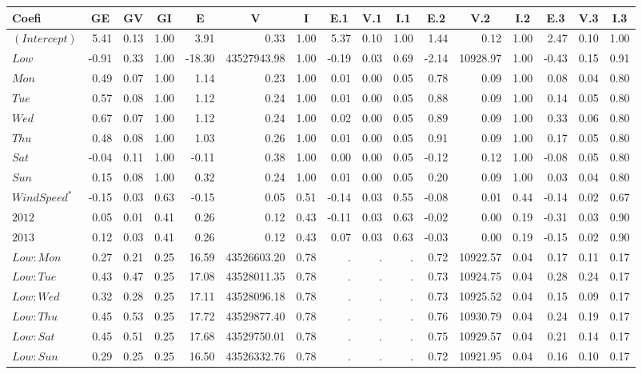 %
\begin{table}[!tbp]
\begin{center}
\begin{tabular}{lrrrrrrrrrrrrrrr}
\hline\hline
\multicolumn{1}{l}{Coefi}&\multicolumn{1}{c}{GE}&\multicolumn{1}{c}{GV}&\multicolumn{1}{c}{GI}&\multicolumn{1}{c}{E}&\multicolumn{1}{c}{V}&\multicolumn{1}{c}{I}&\multicolumn{1}{c}{E.1}&\multicolumn{1}{c}{V.1}&\multicolumn{1}{c}{I.1}&\multicolumn{1}{c}{E.2}&\multicolumn{1}{c}{V.2}&\multicolumn{1}{c}{I.2}&\multicolumn{1}{c}{E.3}&\multicolumn{1}{c}{V.3}&\multicolumn{1}{c}{I.3}\tabularnewline
\hline
$(Intercept)$& 5.41&0.13&1.00&  3.91&       0.33&1.00& 5.37&0.10&1.00& 1.44&    0.12&1.00& 2.47&0.10&1.00\tabularnewline
$Low$&-0.91&0.33&1.00&-18.30&43527943.98&1.00&-0.19&0.03&0.69&-2.14&10928.97&1.00&-0.43&0.15&0.91\tabularnewline
$Mon$& 0.49&0.07&1.00&  1.14&       0.23&1.00& 0.01&0.00&0.05& 0.78&    0.09&1.00& 0.08&0.04&0.80\tabularnewline
$Tue$& 0.57&0.08&1.00&  1.12&       0.24&1.00& 0.01&0.00&0.05& 0.88&    0.09&1.00& 0.14&0.05&0.80\tabularnewline
$Wed$& 0.67&0.07&1.00&  1.12&       0.24&1.00& 0.02&0.00&0.05& 0.89&    0.09&1.00& 0.33&0.06&0.80\tabularnewline
$Thu$& 0.48&0.08&1.00&  1.03&       0.26&1.00& 0.01&0.00&0.05& 0.91&    0.09&1.00& 0.17&0.05&0.80\tabularnewline
$Sat$&-0.04&0.11&1.00& -0.11&       0.38&1.00& 0.00&0.00&0.05&-0.12&    0.12&1.00&-0.08&0.05&0.80\tabularnewline
$Sun$& 0.15&0.08&1.00&  0.32&       0.24&1.00& 0.01&0.00&0.05& 0.20&    0.09&1.00& 0.03&0.04&0.80\tabularnewline
$Wind Speed^*$&-0.15&0.03&0.63& -0.15&       0.05&0.51&-0.14&0.03&0.55&-0.08&    0.01&0.44&-0.14&0.02&0.67\tabularnewline
$2012$& 0.05&0.01&0.41&  0.26&       0.12&0.43&-0.11&0.03&0.63&-0.02&    0.00&0.19&-0.31&0.03&0.90\tabularnewline
$2013$& 0.12&0.03&0.41&  0.26&       0.12&0.43& 0.07&0.03&0.63&-0.03&    0.00&0.19&-0.15&0.02&0.90\tabularnewline
$Low:Mon$& 0.27&0.21&0.25& 16.59&43526603.20&0.78&.&.&.& 0.72&10922.57&0.04& 0.17&0.11&0.17\tabularnewline
$Low:Tue$& 0.43&0.47&0.25& 17.08&43528011.35&0.78&.&.&.& 0.73&10924.75&0.04& 0.28&0.24&0.17\tabularnewline
$Low:Wed$& 0.32&0.28&0.25& 17.11&43528096.18&0.78&.&.&.& 0.73&10925.52&0.04& 0.15&0.09&0.17\tabularnewline
$Low:Thu$& 0.45&0.53&0.25& 17.72&43529877.40&0.78&.&.&.& 0.76&10930.79&0.04& 0.24&0.19&0.17\tabularnewline
$Low:Sat$& 0.45&0.51&0.25& 17.68&43529750.01&0.78&.&.&.& 0.75&10929.57&0.04& 0.21&0.14&0.17\tabularnewline
$Low:Sun$& 0.29&0.25&0.25& 16.50&43526332.76&0.78&.&.&.& 0.72&10921.95&0.04& 0.16&0.10&0.17\tabularnewline
\hline
\end{tabular}
\end{center}
\end{table}

